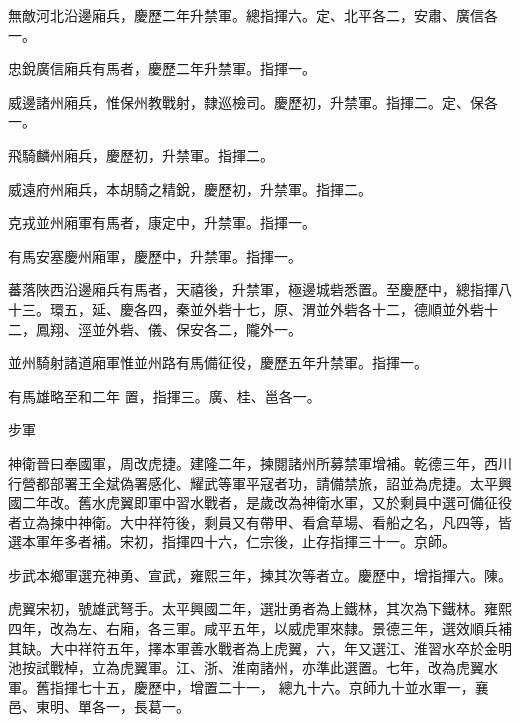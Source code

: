 \begin{pinyinscope}
 無敵河北沿邊廂兵，慶歷二年升禁軍。總指揮六。定、北平各二，安肅、廣信各一。



 忠銳廣信廂兵有馬者，慶歷二年升禁軍。指揮一。



 威邊諸州廂兵，惟保州教戰射，隸巡檢司。慶歷初，升禁軍。指揮二。定、保各一。



 飛騎麟州廂兵，慶歷初，升禁軍。指揮二。



 威遠府州廂兵，本胡騎之精銳，慶歷初，升禁軍。指揮二。



 克戎並州廂軍有馬者，康定中，升禁軍。指揮一。



 有馬安塞慶州廂軍，慶歷中，升禁軍。指揮一。



 蕃落陜西沿邊廂兵有馬者，天禧後，升禁軍，極邊城砦悉置。至慶歷中，總指揮八十三。環五，延、慶各四，秦並外砦十七，原、渭並外砦各十二，德順並外砦十二，鳳翔、涇並外砦、儀、保安各二，隴外一。



 並州騎射諸道廂軍惟並州路有馬備征役，慶歷五年升禁軍。指揮一。



 有馬雄略至和二年
 置，指揮三。廣、桂、邕各一。



 步軍



 神衛晉曰奉國軍，周改虎捷。建隆二年，揀閱諸州所募禁軍增補。乾德三年，西川行營都部署王全斌偽署感化、耀武等軍平寇者功，請備禁旅，詔並為虎捷。太平興國二年改。舊水虎翼即軍中習水戰者，是歲改為神衛水軍，又於剩員中選可備征役者立為揀中神衛。大中祥符後，剩員又有帶甲、看倉草場、看船之名，凡四等，皆選本軍年多者補。宋初，指揮四十六，仁宗後，止存指揮三十一。京師。



 步武本鄉軍選充神勇、宣武，雍熙三年，揀其次等者立。慶歷中，增指揮六。陳。



 虎翼宋初，號雄武弩手。太平興國二年，選壯勇者為上鐵林，其次為下鐵林。雍熙四年，改為左、右廂，各三軍。咸平五年，以威虎軍來隸。景德三年，選效順兵補其缺。大中祥符五年，擇本軍善水戰者為上虎翼，六，年又選江、淮習水卒於金明池按試戰棹，立為虎翼軍。江、浙、淮南諸州，亦準此選置。七年，改為虎翼水軍。舊指揮七十五，慶歷中，增置二十一，
 總九十六。京師九十並水軍一，襄邑、東明、單各一，長葛一。




\end{pinyinscope}
